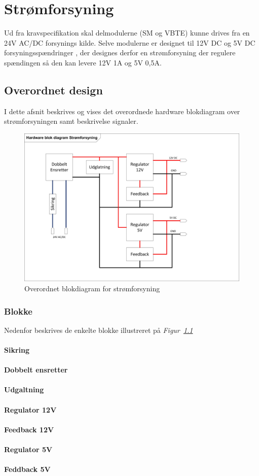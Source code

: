 \chapter{Strømforsyning}
Ud fra kravspecifikation skal delmodulerne (SM og VBTE) kunne drives fra en 24V AC/DC forsynings kilde. Selve modulerne er designet til 12V DC og 5V DC forsyningsspændringer , der designes derfor en strømforsyning der regulere spændingen så den kan levere 12V 1A og 5V 0,5A.  

\section{Overordnet design}
I dette afsnit beskrives og vises det overordnede hardware blokdiagram over strømforsyningen samt beskrivelse signaler.

\begin{figure}[H]
\centering
\includegraphics[width=1\textwidth]{billeder/PowerSupplyBlok}
\caption{Overordnet blokdiagram for strømforsyning}
\label{fig:PowerSubbly Blok}
\end{figure}
\subsection{Blokke}
Nedenfor beskrives de enkelte blokke illustreret på \textit{Figur~\ref{fig:PowerSubbly Blok}}
\subsubsection{Sikring}
\subsubsection{Dobbelt ensretter}
\subsubsection{Udgaltning}
\subsubsection{Regulator 12V}
\subsubsection{Feedback 12V}
\subsubsection{Regulator 5V}
\subsubsection{Feddback 5V}